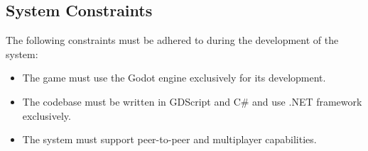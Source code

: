 \subsection{System Constraints}

\noindent The following constraints must be adhered to during the development of the system:
  \begin{itemize}
    \item The game must use the Godot engine exclusively for its development.
    \item The codebase must be written in GDScript and C\# and  use .NET framework exclusively.
    \item The system must support peer-to-peer and multiplayer capabilities.
  \end{itemize}